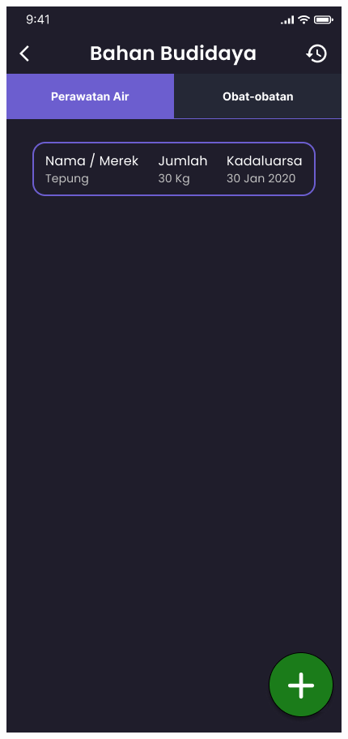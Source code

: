 \begin{enumerate}
\begin{enumerate}
		\begin{figure}[H]
			  \includegraphics[width=\linewidth]{gambar/sprint1/mockup_detail_materials.png}

\end{figure}
\end{enumerate}
\end{enumerate}
